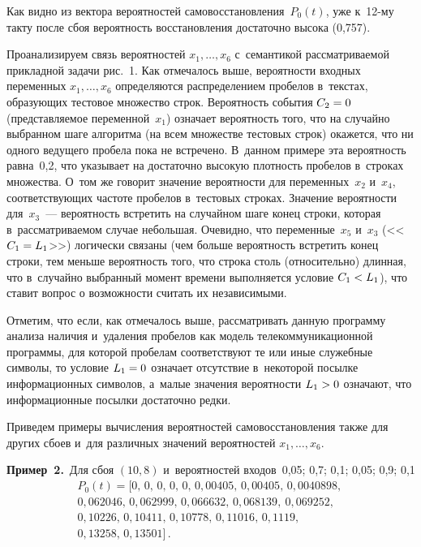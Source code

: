 \begin{multicols}{2}
     Как видно из вектора вероятностей самовосстановления~$P_0(t)$, уже 
к~12-му такту после сбоя вероятность восстановления достаточно высока\linebreak 
(0,757). 

Проанализируем связь вероятностей $x_1, \ldots, x_6$ с~семантикой 
рассматриваемой прикладной задачи рис.~1. Как отмечалось выше, 
вероятности входных переменных $x_1, \ldots, x_6$ определяются 
распределением пробелов в~текстах, образующих тестовое множество строк. 
Вероятность события $C_2\hm=0$\linebreak (представляемое переменной~$x_1$) означает 
вероятность того, что на случайно выбранном шаге алгорит\-ма (на всем 
множестве тестовых строк) окажется, что ни одного ведущего пробела пока не 
встречено. В~данном примере эта вероятность равна~0,2, что указывает на 
достаточно высокую плотность пробелов в~строках множества. О~том же 
говорит значение вероятности для переменных~$x_2$ и~$x_4$, соответствующих 
частоте пробелов в~тестовых строках. Значение вероятности для~$x_3$~--- 
вероятность встретить на случайном шаге конец строки, которая 
в~рассматриваемом случае небольшая. Очевидно, что переменные~$x_5$ 
и~$x_3$ (<<$C_1\hm=L_1$>>) логически связаны (чем больше вероятность 
встретить конец строки, тем меньше вероятность того, что строка столь 
(относительно) длинная, что в~случайно выбранный момент времени 
выполняется условие $C_1\hm<L_1$), что ставит вопрос о возможности 
считать их независимыми. 
     
     Отметим, что если, как отмечалось выше, рассматривать данную 
программу анализа наличия и~удаления пробелов как модель 
телекоммуникационной программы, для которой пробелам соответствуют те 
или иные служебные символы, то условие $L_1\hm=0$ означает отсутствие 
в~некоторой посылке информационных символов, а~малые значения 
вероятности $L_1\hm>0$ означают, что информационные посылки достаточно 
редки. 
     
     Приведем примеры вычисления вероятностей самовосстановления также 
для других сбоев и~для различных значений вероятностей $x_1, \ldots, x_6$.

\medskip

\noindent
\textbf{Пример~2.}\ Для сбоя $(10,8)$ и~вероятностей входов~0,05; 0,7; 0,1; 0,05; 
0,9; 0,1 
\begin{multline*}
P_0(t) = [0,\, 0,\, 0,\, 0,\, 0,\, 0{,}00405,\, 0{,}00405,\, 0{,}0040898,\, \\
0{,}062046,\, 0{,}062999, \,0{,}066632, \,0{,}068139,\ 0{,}069252,\,\\
 0{,}10226,\, 0{,}10411,\, 0{,}10778, \,0{,}11016,\,0{,}1119, \\
 0{,}13258,\, 0{,}13501]\,.
\end{multline*}


\end{multicols}

